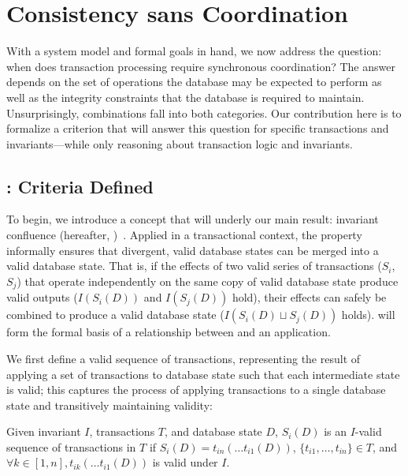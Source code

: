 
\section{Consistency sans Coordination}
\label{sec:bcc-theory}

With a system model and formal goals in hand, we now address the
question: when does transaction processing require synchronous
coordination? The answer depends on the set of operations the database
may be expected to perform as well as the integrity constraints that
the database is required to maintain. Unsurprisingly, combinations
fall into both categories. Our contribution here is to formalize a
criterion that will answer this question for specific transactions and
invariants---while only reasoning about transaction logic and
invariants.

\subsection{\iconfluence: Criteria Defined}

To begin, we introduce a concept that will underly our main result:
invariant confluence (hereafter,
\iconfluence)~\cite{obs-confluence}. Applied in a transactional
context, the \iconfluence property informally ensures that divergent,
valid database states can be merged into a valid database state. That
is, if the effects of two valid series of transactions ($S_i$, $S_j$)
that operate independently on the same copy of valid database state
produce valid outputs ($I(S_i(D))$ and $I(S_j(D))$ hold), their
effects can safely be combined to produce a valid database state
($I(S_i(D) \sqcup S_j(D))$ holds). \iconfluence will form the formal
basis of a relationship between \cfreedom and an application.

We first define a valid sequence of transactions, representing the
result of applying a set of transactions to database state such that
each intermediate state is valid; this captures the process of
applying transactions to a single database state and transitively
maintaining validity:

\begin{definition}
Given invariant $I$, transactions $T$, and database state $D$,
$S_i(D)$ is an $I$-valid sequence of transactions in $T$ if $S_i(D) =
t_{in}(\dots t_{i1}(D))$, $\{t_{i1}, \dots, t_{in}\} \in T$, and
$\forall k \in [1, n], t_{ik}(\dots t_{i1}(D))$ is valid under $I$.
\end{definition}

